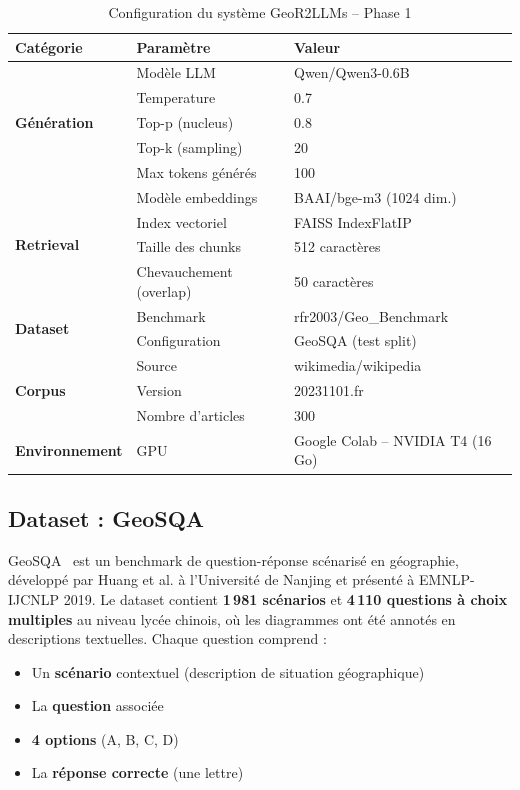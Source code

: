\documentclass[12pt,a4paper]{article}
\begin{document}
\begin{table}[H]
\centering
\caption{Configuration du système GeoR2LLMs -- Phase 1}
\label{tab:config}
\begin{tabular}{@{} l l l @{}}
\toprule
\textbf{Catégorie} & \textbf{Paramètre} & \textbf{Valeur} \\
\midrule
\multirow{5}{*}{\textbf{Génération}}
  & Modèle LLM & Qwen/Qwen3-0.6B \\
  & Temperature & 0.7 \\
  & Top-p (nucleus) & 0.8 \\
  & Top-k (sampling) & 20 \\
  & Max tokens générés & 100 \\
\midrule
\multirow{4}{*}{\textbf{Retrieval}}
  & Modèle embeddings & BAAI/bge-m3 (1024 dim.) \\
  & Index vectoriel & FAISS IndexFlatIP \\
  & Taille des chunks & 512 caractères \\
  & Chevauchement (overlap) & 50 caractères \\
\midrule
\multirow{2}{*}{\textbf{Dataset}}
  & Benchmark & rfr2003/Geo\_Benchmark \\
  & Configuration & GeoSQA (test split) \\
\midrule
\multirow{3}{*}{\textbf{Corpus}}
  & Source & wikimedia/wikipedia \\
  & Version & 20231101.fr \\
  & Nombre d'articles & 300 \\
\midrule
\textbf{Environnement} & GPU & Google Colab -- NVIDIA T4 (16 Go) \\
\bottomrule
\end{tabular}
\end{table}

\subsection{Dataset : GeoSQA}

GeoSQA~\cite{huang_geosqa_2019} est un benchmark de question-réponse scénarisé en géographie, développé par Huang et al. à l'Université de Nanjing et présenté à EMNLP-IJCNLP 2019. Le dataset contient \textbf{1\,981 scénarios} et \textbf{4\,110 questions à choix multiples} au niveau lycée chinois, où les diagrammes ont été annotés en descriptions textuelles. Chaque question comprend :
\begin{itemize}[leftmargin=*]
  \item Un \textbf{scénario} contextuel (description de situation géographique)
  \item La \textbf{question} associée
  \item \textbf{4 options} (A, B, C, D)
  \item La \textbf{réponse correcte} (une lettre)
\end{itemize}
\end{document}
